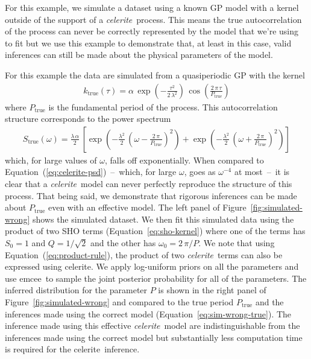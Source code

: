 \documentclass[manuscript, letterpaper]{aastex6}
\makeatletter
\let\origsubsection\subsection
\renewcommand\subsection{\@ifstar{\starsubsection}{\nostarsubsection}}
\newcommand\nostarsubsection[1]{\subsectionprelude\origsubsection{#1}}
\newcommand\starsubsection[1]{\subsectionprelude\origsubsection*{#1}}
\newcommand\subsectionprelude{\vspace{1em}}
\newcommand{\project}[1]{\textsf{#1}}
\newcommand{\celerite}{\project{celerite}}
\newcommand{\celeriteterm}{\emph{celerite}}
\newcommand{\emcee}{\project{emcee}}
\newcommand{\figureref}[1]{\ref{fig:#1}}
\newcommand{\Figure}[1]{Figure~\figureref{#1}}
\renewcommand{\eqref}[1]{\ref{eq:#1}}
\newcommand{\Eq}[1]{Equation~(\eqref{#1})}
\newcommand{\eq}[1]{\Eq{#1}}
\newcommand{\eqalt}[1]{Equation~\eqref{#1}}
\newcommand{\eqlabel}[1]{\label{eq:#1}}
\makeatother
\begin{document}
\subsection{Inferences with the ``wrong'' model}

For this example, we simulate a dataset using a known GP model with a kernel
outside of the support of a \celeriteterm\ process.
This means the true autocorrelation of the process can never be correctly
represented by the model that we're using to fit but we use this example
to demonstrate that, at least in this case, valid inferences can still be made
about the physical parameters of the model.

For this example the data are simulated from a quasiperiodic GP with the
kernel
\begin{eqnarray}\eqlabel{sim-wrong-true}
k_\mathrm{true} (\tau) = \alpha\,
    \exp\left(-\frac{\tau^2}{2\,\lambda^2}\right)\,
    \cos\left(\frac{2\,\pi\,\tau}{P_\mathrm{true}}\right)
\end{eqnarray}
where $P_\mathrm{true}$ is the fundamental period of the process.
This autocorrelation structure corresponds to the power spectrum
\begin{eqnarray}
S_\mathrm{true} (\omega) = \frac{\lambda\,\alpha}{2}\,\left[
    \exp\left(-\frac{\lambda^2}{2}\,\left(\omega-
        \frac{2\,\pi}{P_\mathrm{true}}\right)^2\right) +
    \exp\left(-\frac{\lambda^2}{2}\,\left(\omega+
        \frac{2\,\pi}{P_\mathrm{true}}\right)^2\right)
\right]
\end{eqnarray}
which, for large values of $\omega$, falls off exponentially.
When compared to \eq{celerite-psd}~--~which, for large $\omega$, goes as
$\omega^{-4}$ at most~--~it is clear that a \celeriteterm\ model can never
perfectly reproduce the structure of this process.
That being said, we demonstrate that rigorous inferences can be made
about $P_\mathrm{true}$ even with an effective model.
The left panel of \Figure{simulated-wrong} shows the simulated dataset.
We then fit this simulated data using the product of two SHO terms
(\eqalt{sho-kernel}) where one of the terms has $S_0 = 1$ and $Q =
1/\sqrt{2}$ and the other has $\omega_0 = 2\,\pi/P$.
We note that using \eq{product-rule}, the product of two \celeriteterm\ terms can
also be expressed using \celerite.
We apply log-uniform priors on all the parameters and use \emcee\ to sample
the joint posterior probability for all of the parameters.
The inferred distribution for the parameter $P$ is shown in the right panel of
\Figure{simulated-wrong} and compared to the true period $P_\mathrm{true}$ and
the inferences made using the correct model (\eqalt{sim-wrong-true}).
The inference made using this effective \celeriteterm\ model are indistinguishable
from the inferences made using the correct model but substantially less
computation time is required for the \celerite\ inference.
\end{document}
